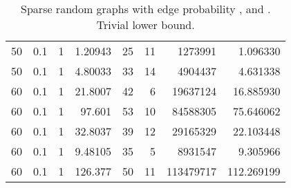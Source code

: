 \documentclass[a4paper,11pt]{article}
\begin{document}
\begin{table}
\begin{center}
\begin{tabular}{|rrr|r|r|rr|r|}
50 & 0.1 & 1 & 1.20943 & 25 & 11 & 1273991 & 1.096330 \\
50 & 0.1 & 1 & 4.80033 & 33 & 14 & 4904437 & 4.631338 \\
60 & 0.1 & 1 & 21.8007 & 42 & 6 & 19637124 & 16.885930 \\
60 & 0.1 & 1 & 97.601 & 53 & 10 & 84588305 & 75.646062 \\
60 & 0.1 & 1 & 32.8037 & 39 & 12 & 29165329 & 22.103448 \\
60 & 0.1 & 1 & 9.48105 & 35 & 5 & 8931547 & 9.305966 \\
60 & 0.1 & 1 & 126.377 & 50 & 11 & 113479717 & 112.269199 \\
\hline
\end{tabular}
\end{center}
\caption{Sparse random graphs with edge probability ,
   and . Trivial lower bound.}
\label{tab:sparse-norebal}
\end{table}
\end{document}
